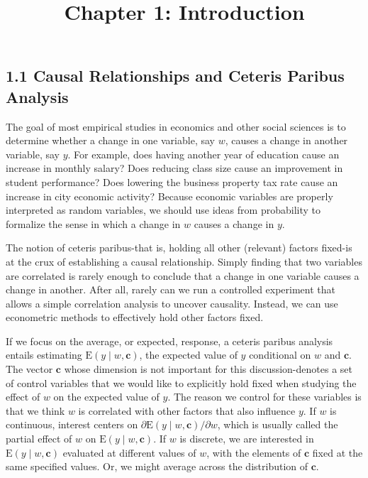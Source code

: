 \documentclass[10pt]{article}
\title{Chapter 1: Introduction}
\author{}
\date{}
\begin{document}
\maketitle

\subsection*{1.1 Causal Relationships and Ceteris Paribus Analysis}
The goal of most empirical studies in economics and other social sciences is to determine whether a change in one variable, say $w$, causes a change in another variable, say $y$. For example, does having another year of education cause an increase in monthly salary? Does reducing class size cause an improvement in student performance? Does lowering the business property tax rate cause an increase in city economic activity? Because economic variables are properly interpreted as random variables, we should use ideas from probability to formalize the sense in which a change in $w$ causes a change in $y$.

The notion of ceteris paribus-that is, holding all other (relevant) factors fixed-is at the crux of establishing a causal relationship. Simply finding that two variables are correlated is rarely enough to conclude that a change in one variable causes a change in another. After all, rarely can we run a controlled experiment that allows a simple correlation analysis to uncover causality. Instead, we can use econometric methods to effectively hold other factors fixed.

If we focus on the average, or expected, response, a ceteris paribus analysis entails estimating $\mathrm{E}(y \mid w, \mathbf{c})$, the expected value of $y$ conditional on $w$ and $\mathbf{c}$. The vector $\mathbf{c}$ whose dimension is not important for this discussion-denotes a set of control variables that we would like to explicitly hold fixed when studying the effect of $w$ on the expected value of $y$. The reason we control for these variables is that we think $w$ is correlated with other factors that also influence $y$. If $w$ is continuous, interest centers on $\partial \mathrm{E}(y \mid w, \mathbf{c}) / \partial w$, which is usually called the partial effect of $w$ on $\mathrm{E}(y \mid w, \mathbf{c})$. If $w$ is discrete, we are interested in $\mathrm{E}(y \mid w, \mathbf{c})$ evaluated at different values of $w$, with the elements of $\mathbf{c}$ fixed at the same specified values. Or, we might average across the distribution of $\mathbf{c}$.
\end{document}
